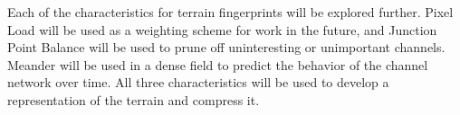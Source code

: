 
Each of the characteristics for terrain fingerprints will be explored further.
Pixel Load will be used as a weighting scheme for work in the future, and Junction Point Balance will be used to prune off uninteresting or unimportant channels. Meander will be used in a dense field to predict the behavior of the channel network over time. All three characteristics will be used to develop a representation of the terrain and compress it. 


